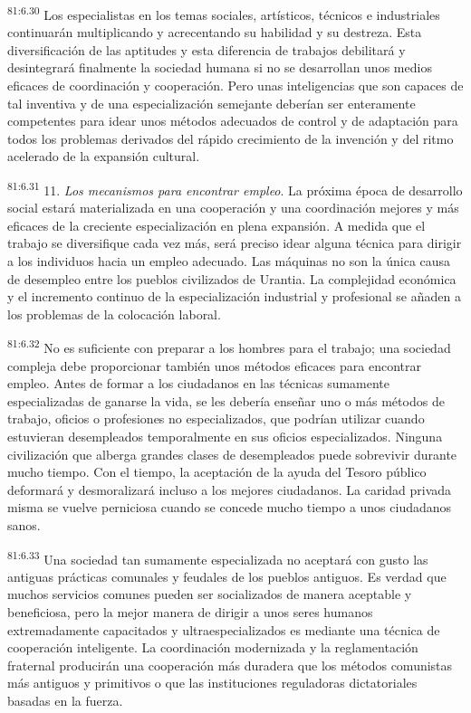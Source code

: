 \documentclass[twoside, 11pt]{book}
\begin{document}
\par
\textsuperscript{81:6.30} Los especialistas en los temas sociales, artísticos, técnicos e industriales continuarán multiplicando y acrecentando su habilidad y su destreza. Esta diversificación de las aptitudes y esta diferencia de trabajos debilitará y desintegrará finalmente la sociedad humana si no se desarrollan unos medios eficaces de coordinación y cooperación. Pero unas inteligencias que son capaces de tal inventiva y de una especialización semejante deberían ser enteramente competentes para idear unos métodos adecuados de control y de adaptación para todos los problemas derivados del rápido crecimiento de la invención y del ritmo acelerado de la expansión cultural.

\par
\textsuperscript{81:6.31} 11. \textit{Los mecanismos para encontrar empleo}. La próxima época de desarrollo social estará materializada en una cooperación y una coordinación mejores y más eficaces de la creciente especialización en plena expansión. A medida que el trabajo se diversifique cada vez más, será preciso idear alguna técnica para dirigir a los individuos hacia un empleo adecuado. Las máquinas no son la única causa de desempleo entre los pueblos civilizados de Urantia. La complejidad económica y el incremento continuo de la especialización industrial y profesional se añaden a los problemas de la colocación laboral.

\par
\textsuperscript{81:6.32} No es suficiente con preparar a los hombres para el trabajo; una sociedad compleja debe proporcionar también unos métodos eficaces para encontrar empleo. Antes de formar a los ciudadanos en las técnicas sumamente especializadas de ganarse la vida, se les debería enseñar uno o más métodos de trabajo, oficios o profesiones no especializados, que podrían utilizar cuando estuvieran desempleados temporalmente en sus oficios especializados. Ninguna civilización que alberga grandes clases de desempleados puede sobrevivir durante mucho tiempo. Con el tiempo, la aceptación de la ayuda del Tesoro público deformará y desmoralizará incluso a los mejores ciudadanos. La caridad privada misma se vuelve perniciosa cuando se concede mucho tiempo a unos ciudadanos sanos.

\par
\textsuperscript{81:6.33} Una sociedad tan sumamente especializada no aceptará con gusto las antiguas prácticas comunales y feudales de los pueblos antiguos. Es verdad que muchos servicios comunes pueden ser socializados de manera aceptable y beneficiosa, pero la mejor manera de dirigir a unos seres humanos extremadamente capacitados y ultraespecializados es mediante una técnica de cooperación inteligente. La coordinación modernizada y la reglamentación fraternal producirán una cooperación más duradera que los métodos comunistas más antiguos y primitivos o que las instituciones reguladoras dictatoriales basadas en la fuerza.
\end{document}
